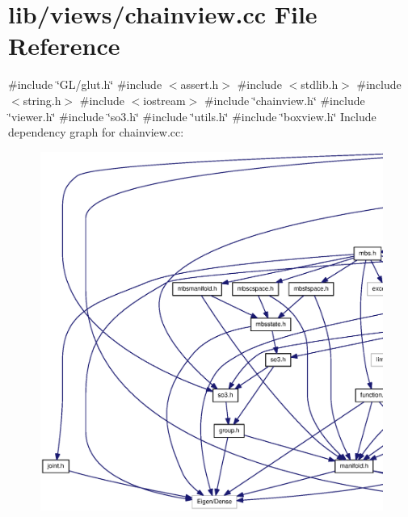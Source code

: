 \section{lib/views/chainview.cc \-File \-Reference}
\label{chainview_8cc}
{\ttfamily \#include \char`\"{}\-G\-L/glut.\-h\char`\"{}}\*
{\ttfamily \#include $<$assert.\-h$>$}\*
{\ttfamily \#include $<$stdlib.\-h$>$}\*
{\ttfamily \#include $<$string.\-h$>$}\*
{\ttfamily \#include $<$iostream$>$}\*
{\ttfamily \#include \char`\"{}chainview.\-h\char`\"{}}\*
{\ttfamily \#include \char`\"{}viewer.\-h\char`\"{}}\*
{\ttfamily \#include \char`\"{}so3.\-h\char`\"{}}\*
{\ttfamily \#include \char`\"{}utils.\-h\char`\"{}}\*
{\ttfamily \#include \char`\"{}boxview.\-h\char`\"{}}\*
\-Include dependency graph for chainview.\-cc\-:
\nopagebreak
\begin{figure}[H]
\begin{center}
\leavevmode
\includegraphics[width=350pt]{chainview_8cc__incl}
\end{center}
\end{figure}
